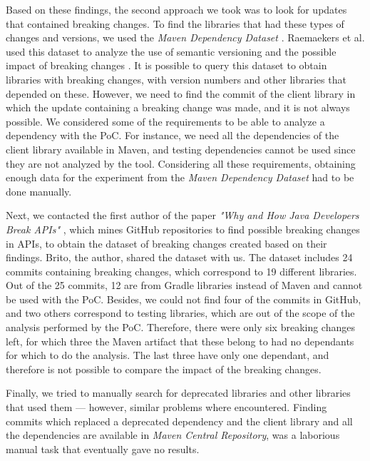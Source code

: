 Based on these findings, the second approach we took was to look for updates that contained breaking changes. To find the libraries that had these types of changes and versions, we used the \textit{Maven Dependency Dataset} \cite{Raemaekers2013}. Raemaekers et al. used this dataset to analyze the use of semantic versioning and the possible impact of breaking changes \cite{Raemaekers2017}. It is possible to query this dataset to obtain libraries with breaking changes, with version numbers and other libraries that depended on these. However, we need to find the commit of the client library in which the update containing a breaking change was made, and it is not always possible. We considered some of the requirements to be able to analyze a dependency with the PoC. For instance, we need all the dependencies of the client library available in Maven, and testing dependencies cannot be used since they are not analyzed by the tool. Considering all these requirements, obtaining enough data for the experiment from the \textit{Maven Dependency Dataset} had to be done manually.

Next, we contacted the first author of the paper \textit{"Why and How Java Developers Break APIs"} \cite{Brito2018}, which mines GitHub repositories to find possible breaking changes in APIs, to obtain the dataset of breaking changes created based on their findings. Brito, the author, shared the dataset with us. The dataset includes 24 commits containing breaking changes, which correspond to 19 different libraries. Out of the 25 commits, 12 are from Gradle libraries instead of Maven and cannot be used with the PoC. Besides, we could not find four of the commits in GitHub, and two others correspond to testing libraries, which are out of the scope of the analysis performed by the PoC. Therefore, there were only six breaking changes left, for which three the Maven artifact that these belong to had no dependants for which to do the analysis. The last three have only one dependant, and therefore is not possible to compare the impact of the breaking changes.

Finally, we tried to manually search for deprecated libraries and other libraries that used them — however, similar problems where encountered. Finding commits which replaced a deprecated dependency and the client library and all the dependencies are available in \textit{Maven Central Repository}, was a laborious manual task that eventually gave no results.

